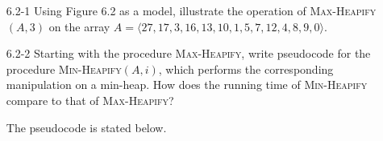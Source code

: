 \begin{enumerate}

\item[6.2-1]{Using Figure 6.2 as a model, illustrate the operation of
\textsc{Max-Heapify}$(A, 3)$ on the array
$A = \langle 27, 17, 3, 16, 13, 10, 1, 5, 7, 12, 4, 8, 9, 0 \rangle$.}

\begin{framed}
\begin{center}
\end{center}
\end{framed}

\item[6.2-2]{Starting with the procedure \textsc{Max-Heapify}, write pseudocode
for the procedure \textsc{Min-Heapify}$(A, i)$, which performs the corresponding
manipulation on a min-heap. How does the running time of \textsc{Min-Heapify}
compare to that of \textsc{Max-Heapify}?}

\begin{framed}
The pseudocode is stated below.


\end{framed}
\end{enumerate}
